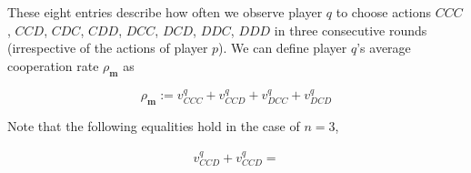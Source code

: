 \documentclass{article}
\theoremstyle{definition}
\begin{document}
These eight entries describe how often we observe player $q$ to choose actions
$CCC$, $CCD$, $CDC$, $CDD$, $DCC$, $DCD$, $DDC$, $DDD$ in three consecutive
rounds (irrespective of the actions of player $p$). We can define player $q$'s
average cooperation rate $\rho_\mathbf{m}$ as 

\begin{equation} \label{Eq:rhoq_n3}
\rho_\mathbf{m} := v^q_{CCC} + v^q_{CCD} + v^q_{DCC} + v^q_{DCD}
\end{equation}

Note that the following equalities hold in the case of $n=3$,

\begin{align}
  v^{q}_{CCD} + v^{q}_{CCD}  = 
\end{align}








 
\end{document}
